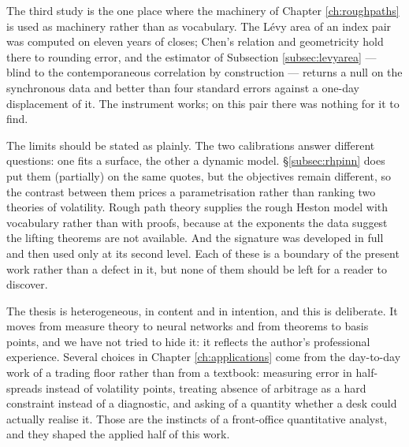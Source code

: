 The third study is the one place where the machinery of Chapter \ref{ch:roughpaths} is used as
machinery rather than as vocabulary. The L\'evy area of an index pair was computed on eleven years of
closes; Chen's relation and geometricity hold there to rounding error, and the estimator of
Subsection \ref{subsec:levyarea} --- blind to the contemporaneous correlation by construction ---
returns a null on the synchronous data and better than four standard errors against a one-day
displacement of it. The instrument works; on this pair there was nothing for it to find.

The limits should be stated as plainly. The two calibrations answer different questions: one fits a surface, the other a
dynamic model. \S\ref{subsec:rhpinn} does put them (partially) on the same quotes, but the objectives remain
different, so the contrast between them prices a parametrisation rather than ranking two theories
of volatility.
Rough path theory supplies the rough Heston model with vocabulary rather than with proofs, because
at the exponents the data suggest the lifting theorems are not available. And the signature was
developed in full and then used only at its second level. Each of these is a boundary of the present
work rather than a defect in it, but none of them should be left for a reader to discover.


The thesis is heterogeneous, in content and in intention, and this is deliberate. It moves from
measure theory to neural networks and from theorems to basis points, and we have not tried  to hide
it: it reflects the author's professional experience. Several choices in Chapter \ref{ch:applications} come
from the day-to-day work of a trading floor rather than from a textbook: measuring error in half-spreads instead of
volatility points, treating absence of arbitrage as a hard constraint instead of a diagnostic, and
asking of a quantity whether a desk could actually realise it. Those are the instincts of a
front-office quantitative analyst, and they shaped the applied half of this work.


